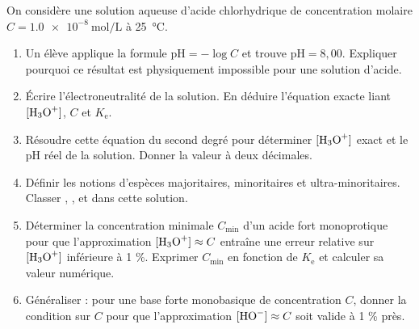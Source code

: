 \documentclass[11pt]{article}
\begin{document}
\begin{exercice}
On considère une solution aqueuse d'acide chlorhydrique de concentration molaire $C = \SI{1,0e-8}{\mol\per\L}$ à \SI{25}{\celsius}.
\begin{enumerate}
    \item Un élève applique la formule $\text{pH} = -\log C$ et trouve $\text{pH} = 8,00$. Expliquer pourquoi ce résultat est physiquement impossible pour une solution d'acide.
    \item Écrire l'électroneutralité de la solution. En déduire l'équation exacte liant $[\ce{H3O+}]$, $C$ et $K_{\text{e}}$.
    \item Résoudre cette équation du second degré pour déterminer $[\ce{H3O+}]$ exact et le pH réel de la solution. Donner la valeur à deux décimales.
    \item Définir les notions d'espèces majoritaires, minoritaires et ultra-minoritaires. Classer , ,  et  dans cette solution.
    \item Déterminer la concentration minimale $C_{\text{min}}$ d'un acide fort monoprotique pour que l'approximation $[\ce{H3O+}] \approx C$ entraîne une erreur relative sur $[\ce{H3O+}]$ inférieure à 1 \%. Exprimer $C_{\text{min}}$ en fonction de $K_{\text{e}}$ et calculer sa valeur numérique.
    \item Généraliser : pour une base forte monobasique de concentration $C$, donner la condition sur $C$ pour que l'approximation $[\ce{HO-}] \approx C$ soit valide à 1 \% près.
\end{enumerate}
\end{exercice}
\end{document}
